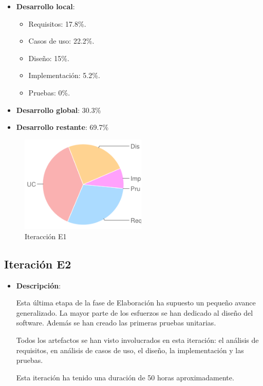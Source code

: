 \begin{minipage}[c]{0.45\linewidth}
  \begin{itemize}    
  \item {\bf Desarrollo local}:
    \begin{itemize}
    \item Requisitos: 17.8\%.
    \item Casos de uso: 22.2\%.
    \item Diseño: 15\%.
    \item Implementación: 5.2\%.
    \item Pruebas: 0\%.
    \end{itemize}
  \item {\bf Desarrollo global}: 30.3\%
  \item {\bf Desarrollo restante}: 69.7\%
  \end{itemize}
\end{minipage}
\begin{minipage}[c]{0.45\linewidth}
  \begin{figure}[H]
    \begin{center}
      \includegraphics[width=6cm]{images/e1.png}

      \caption{Iteracción E1}
      \label{fig::e1}
    \end{center}
  \end{figure}
\end{minipage}


\subsection*{Iteración E2}

\begin{itemize}    
\item {\bf Descripción}:

Esta última etapa de la fase de Elaboración ha supuesto un pequeño avance generalizado. La mayor parte de los esfuerzos se han dedicado al diseño del software. Además se han creado las primeras pruebas unitarias.

Todos los artefactos se han visto involucrados en esta iteración: el análisis de requisitos, en análisis de casos de uso, el diseño, la implementación y las pruebas.

Esta iteración ha tenido una duración de 50 horas aproximadamente.
\end{itemize}

